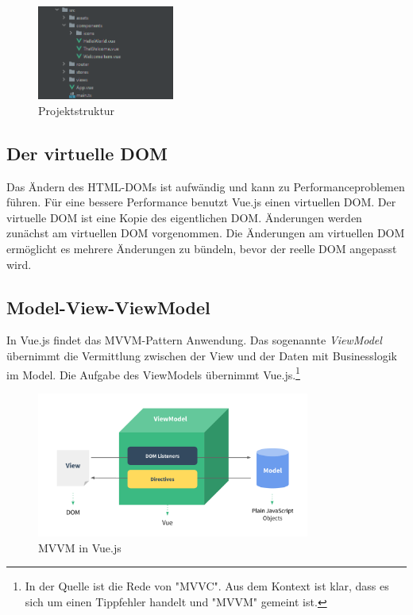 \begin{figure}[H]
    \centering
    \includegraphics[width=0.4\textwidth]{img/vueFileStructure}
    \caption{Projektstruktur}
    \label{fig:vueProjektstruktur}
\end{figure}

\subsection*{Der virtuelle DOM}
Das Ändern des HTML-DOMs ist aufwändig und kann zu Performanceproblemen führen.
Für eine bessere Performance benutzt Vue.js einen virtuellen DOM.
Der virtuelle DOM ist eine Kopie des eigentlichen DOM.
Änderungen werden zunächst am virtuellen DOM vorgenommen.
Die Änderungen am virtuellen DOM ermöglicht es mehrere Änderungen zu bündeln,
bevor der reelle DOM angepasst wird. \cite[S. 10-11]{steyer2019} %

\newpage

\subsection*{Model-View-ViewModel}
In Vue.js findet das MVVM-Pattern Anwendung.
Das sogenannte \emph{ViewModel} übernimmt die Vermittlung zwischen der View
und der Daten mit Businesslogik im Model.
Die Aufgabe des ViewModels übernimmt Vue.js.\cite[S. 43]{steyer2019}\footnote{In der Quelle ist die Rede von "MVVC". Aus dem Kontext ist klar, dass es sich um einen Tippfehler handelt und "MVVM" gemeint ist.}

\begin{figure}[H]
    \centering
    \includegraphics[width=0.8\textwidth]{img/mvvm}
    \caption{MVVM in Vue.js \cite{gettingStarted012}}
    \label{fig:mvvm}
\end{figure}

